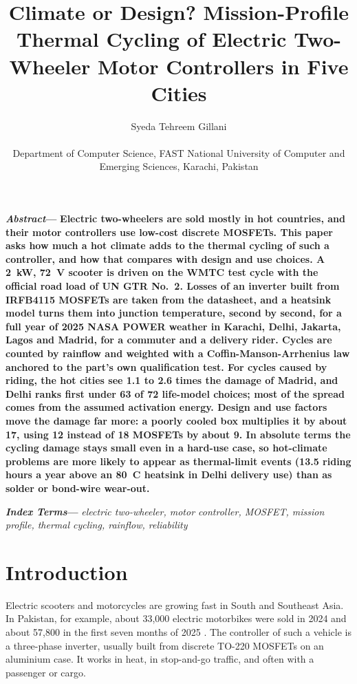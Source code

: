 \documentclass[conference]{IEEEtran}
\makeatletter
\newcommand{\IEEEauthorblockN}[1]{{\large #1}\\}
\newcommand{\IEEEauthorblockA}[1]{\normalsize\itshape\begin{tabular}{@{}c@{}}#1\end{tabular}}
\newenvironment{IEEEkeywords}{\par\noindent\textbf{\textit{Index Terms}---}\itshape}{\par}
\renewenvironment{abstract}{\par\noindent\textbf{\textit{Abstract}---}\bfseries}{\par\medskip}
\makeatother
\begin{document}
\title{Climate or Design? Mission-Profile Thermal Cycling of Electric Two-Wheeler Motor Controllers in Five Cities}

\author{\IEEEauthorblockN{Syeda Tehreem Gillani}
\IEEEauthorblockA{Department of Computer Science, FAST National University of Computer and Emerging Sciences, Karachi, Pakistan}}

\maketitle

\begin{abstract}
Electric two-wheelers are sold mostly in hot countries, and their motor
controllers use low-cost discrete MOSFETs. This paper asks how much a hot
climate adds to the thermal cycling of such a controller, and how that
compares with design and use choices. A 2~kW, 72~V scooter is driven on the
WMTC test cycle with the official road load of UN GTR No.~2. Losses of an
inverter built from IRFB4115 MOSFETs are taken from the datasheet, and a
heatsink model turns them into junction temperature, second by second,
for a full year of 2025 NASA POWER weather in Karachi, Delhi, Jakarta,
Lagos and Madrid, for a commuter and a delivery rider. Cycles are counted
by rainflow and weighted with a Coffin-Manson-Arrhenius law anchored to the
part's own qualification test. For cycles caused by riding, the hot cities
see 1.1 to 2.6 times the damage of Madrid, and Delhi ranks first under 63 of
72 life-model choices; most of the spread comes from the assumed activation
energy. Design and use factors move the damage far more: a poorly cooled
box multiplies it by about 17, using 12 instead of 18 MOSFETs by about 9.
In absolute terms the cycling damage stays small even in a hard-use case,
so hot-climate problems are more likely to appear as thermal-limit events
(13.5 riding hours a year above an 80~\textdegree C heatsink in Delhi
delivery use) than as solder or bond-wire wear-out.
\end{abstract}

\begin{IEEEkeywords}
electric two-wheeler, motor controller, MOSFET, mission profile, thermal cycling, rainflow, reliability
\end{IEEEkeywords}

\section{Introduction}
Electric scooters and motorcycles are growing fast in South and Southeast
Asia. In Pakistan, for example, about 33{,}000 electric motorbikes were
sold in 2024 and about 57{,}800 in the first seven months of 2025
\cite{profit2025}. The controller of such a vehicle is a three-phase
inverter, usually built from discrete TO-220 MOSFETs on an aluminium case.
It works in heat, in stop-and-go traffic, and often with a passenger or
cargo.
\end{document}
